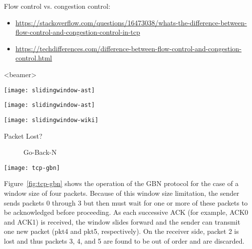 Flow control vs. congestion control:
\begin{itemize}
\item
  \url{https://stackoverflow.com/questions/16473038/whats-the-difference-between-flow-control-and-congestion-control-in-tcp}
\item
  \url{https://techdifferences.com/difference-between-flow-control-and-congestion-control.html}
\end{itemize}

\begin{frame}<beamer>
  \begin{center}
    \texttt{[image: slidingwindow-ast]}
  \end{center}
\end{frame}


\begin{minipage}{.48\linewidth}
  \texttt{[image: slidingwindow-ast]}  
\end{minipage}\hfill
\begin{minipage}{.48\linewidth}
  \texttt{[image: slidingwindow-wiki]}
\end{minipage}

\begin{frame}
  \begin{minipage}{.4\linewidth}
    \begin{description}
    \item[Packet Lost?] Go-Back-N
    \end{description}
  \end{minipage}\qquad
  \begin{minipage}{.4\linewidth}
  \end{minipage}
\end{frame}

\begin{minipage}{.5\linewidth}
  \texttt{[image: tcp-gbn]}\label{fig:tcp-gbn}
\end{minipage}\quad
\begin{minipage}{.5\linewidth}
  Figure~\ref{fig:tcp-gbn} shows the operation of the GBN protocol for the case of a
  window size of four packets. Because of this window size limitation, the sender sends
  packets 0 through 3 but then must wait for one or more of these packets to be
  acknowledged before proceeding. As each successive ACK (for example, ACK0 and ACK1) is
  received, the window slides forward and the sender can transmit one new packet (pkt4 and
  pkt5, respectively). On the receiver side, packet 2 is lost and thus packets 3, 4, and 5
  are found to be out of order and are discarded. 
\end{minipage}

